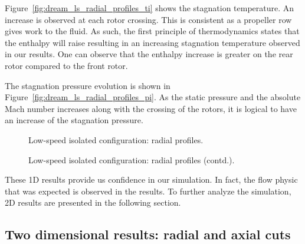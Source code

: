 Figure~\ref{fig:dream_ls_radial_profiles_ti}
shows the stagnation temperature.
An increase is observed at each 
rotor crossing. This is consistent as
a propeller row gives work to the fluid. As such,
the first principle of thermodynamics states that the 
enthalpy will raise resulting in an increasing stagnation
temperature observed in our results. One can observe that
the enthalpy increase is greater on the rear rotor compared
to the front rotor.

The stagnation pressure evolution is shown in 
Figure~\ref{fig:dream_ls_radial_profiles_pi}. As the static pressure
and the absolute Mach number increases along with the crossing of the rotors,
it is logical to have an increase of the stagnation pressure.
\begin{figure}[htp]
  \centering
  \caption{Low-speed isolated configuration: radial profiles.}
\end{figure}
\begin{figure}[htp]
  \centering
  \setcounter{subfigure}{3}
  \caption{Low-speed isolated configuration: radial profiles (contd.).}
  \label{fig:dream_ls_radial_profiles}
\end{figure}

These 1D results provide us confidence in our simulation. 
In fact, the flow physic that
was expected is observed in the results. To further analyze the simulation,
2D results are presented in the following section.

\subsection{Two dimensional results: radial and axial cuts}
\label{sub:dream_ls_flow_field}

